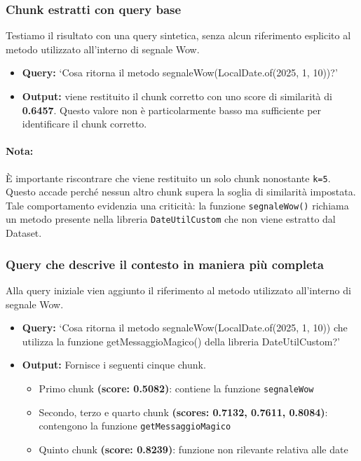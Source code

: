 \documentclass[12pt,a4paper,openright,twoside]{book}
\begin{document}
    \subsubsection{Chunk estratti con query base}
    Testiamo il risultato con una query sintetica, senza alcun riferimento esplicito al metodo utilizzato all'interno di segnale Wow.
    \begin{itemize}
        \item \textbf{Query:} 
            `Cosa ritorna il metodo segnaleWow(LocalDate.of(2025, 1, 10))?'
        \item \textbf{Output:}
        viene restituito il chunk corretto con uno score di similarità di \textbf{0.6457}. Questo valore non è particolarmente basso ma sufficiente per identificare il chunk corretto.
    \end{itemize}
    \paragraph{Nota:}
    È importante riscontrare che viene restituito un solo chunk nonostante \texttt{k=5}.
    Questo accade perché nessun altro chunk supera la soglia di similarità impostata.
    Tale comportamento evidenzia una criticità: la funzione \texttt{segnaleWow()} richiama un metodo presente nella libreria \texttt{DateUtilCustom} che non viene estratto dal Dataset.

    \subsubsection{Query che descrive il contesto in maniera più completa}
    Alla query iniziale vien aggiunto il riferimento al metodo utilizzato all'interno di segnale Wow.
        \begin{itemize}
            \item \textbf{Query:}
                `Cosa ritorna il metodo segnaleWow(LocalDate.of(2025, 1, 10)) che utilizza la funzione getMessaggioMagico() della libreria DateUtilCustom?'
            \item \textbf{Output:}
            Fornisce i seguenti cinque chunk.
            \begin{itemize}
                \item Primo chunk \textbf{(score: 0.5082)}: contiene la funzione \texttt{segnaleWow}
                \item Secondo, terzo e quarto chunk \textbf{(scores: 0.7132, 0.7611, 0.8084)}: contengono la funzione \texttt{getMessaggioMagico}
                \item Quinto chunk \textbf{(score: 0.8239)}: funzione non rilevante relativa alle date
            \end{itemize}
        \end{itemize}
\end{document}
